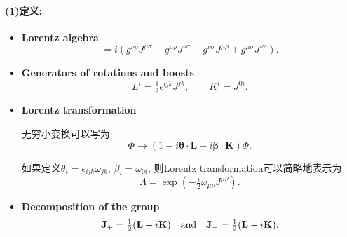 \paragraph*{(1)定义:}
\begin{itemize}
  \item \textbf{Lorentz algebra}
        \begin{equation}
          [J^{\mu\nu}, J^{\rho\sigma}] = i(g^{\nu\rho}J^{\mu\sigma} - g^{\mu\rho}J^{\nu\sigma} - g^{\nu\sigma}J^{\mu\rho} + g^{\mu\sigma}J^{\nu\rho}).
        \end{equation}
  \item \textbf{Generators of rotations and boosts}
        \begin{equation}
          L^i = \tfrac{1}{2}\epsilon^{ijk}J^{jk},\qquad K^i = J^{0i}.
        \end{equation}
  \item \textbf{Lorentz transformation}

        无穷小变换可以写为:
        \begin{equation}
          \Phi \rightarrow (1 - i\bm{\theta}\cdot\mathbf{L} - i\bm{\beta}\cdot\mathbf{K})\Phi.
        \end{equation}

        如果定义$\theta_i = \epsilon_{ijk}\omega_{jk}$, $\beta_i = \omega_{0i}$, 则Lorentz transformation可以简略地表示为
        \begin{equation}
          \Lambda = \exp(-\tfrac{i}{2}\omega_{\mu\nu}J^{\mu\nu}).
        \end{equation}
  \item \textbf{Decomposition of the group}
        \begin{equation}
          \mathbf{J}_+ = \tfrac{1}{2}(\mathbf{L}+i\mathbf{K})\ \ \ {\rm and}\ \ \ \mathbf{J}_- = \tfrac{1}{2}(\mathbf{L}-i\mathbf{K}).
        \end{equation}
\end{itemize}

